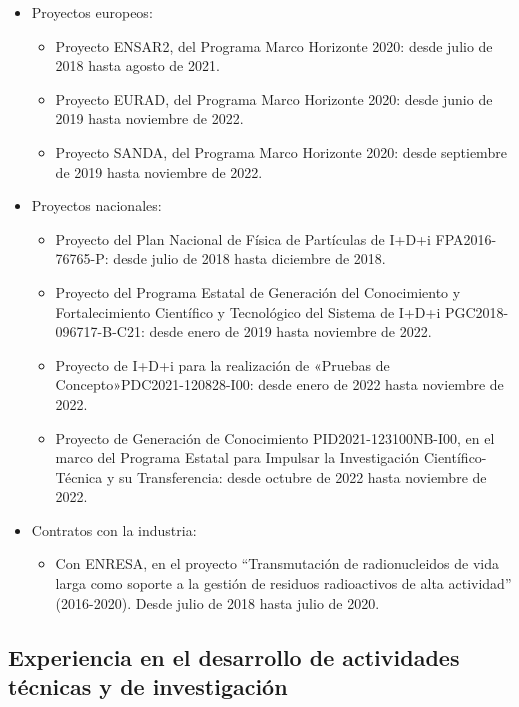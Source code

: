 \documentclass[changecolor={240, 95, 64}]{cv}
\begin{document}
\begin{itemize}
  \item Proyectos europeos:
        \begin{itemize}
          \item Proyecto ENSAR2, del Programa Marco Horizonte 2020: desde julio de 2018 hasta
                agosto de 2021.
          \item Proyecto EURAD, del Programa Marco Horizonte 2020: desde junio de 2019 hasta
                noviembre de 2022.
          \item Proyecto SANDA, del Programa Marco Horizonte 2020: desde septiembre de 2019
                hasta noviembre de 2022.
        \end{itemize}
  \item Proyectos nacionales:
        \begin{itemize}
          \item Proyecto del Plan Nacional de Física de Partículas de I+D+i FPA2016-76765-P: desde julio de 2018 hasta diciembre de 2018.
          \item Proyecto del Programa Estatal de Generación del Conocimiento y Fortalecimiento Científico y Tecnológico del Sistema de I+D+i PGC2018-096717-B-C21: desde enero de 2019 hasta noviembre de 2022.
          \item Proyecto de I+D+i para la realización de «Pruebas de Concepto»PDC2021-120828-I00: desde enero de 2022 hasta noviembre de 2022.
          \item Proyecto de Generación de Conocimiento PID2021-123100NB-I00, en el marco del Programa Estatal para Impulsar la Investigación Científico-Técnica y su Transferencia: desde octubre de 2022 hasta noviembre de 2022.
        \end{itemize}
  \item Contratos con la industria:
        \begin{itemize}
          \item Con ENRESA, en el proyecto “Transmutación de radionucleidos de vida larga como soporte a la gestión de residuos radioactivos de alta actividad” (2016-2020). Desde julio de 2018 hasta julio de 2020.
        \end{itemize}
\end{itemize}

\subsection*{Experiencia en el desarrollo de actividades técnicas y de investigación}
\end{document}
